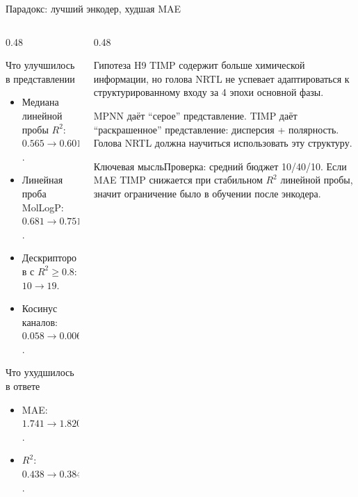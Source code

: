 \documentclass[aspectratio=169,10pt]{beamer}
\newcommand{\keybox}[1]{\begin{block}{Ключевая мысль}#1\end{block}}
\newcommand{\tightitems}{\setlength{\itemsep}{0.25em}}
\begin{document}
\begin{frame}{Парадокс: лучший энкодер, худшая MAE}
  \small
  \begin{columns}[T,onlytextwidth]
    \begin{column}{0.48\textwidth}
      \begin{block}{Что улучшилось в представлении}
        \scriptsize
        \begin{itemize}\tightitems
          \item Медиана линейной пробы $R^2$: $0.565 \to 0.601$.
          \item Линейная проба MolLogP: $0.681 \to 0.751$.
          \item Дескрипторов с $R^2\ge 0.8$: $10 \to 19$.
          \item Косинус каналов: $0.058 \to 0.006$.
        \end{itemize}
      \end{block}
      \begin{block}{Что ухудшилось в ответе}
        \scriptsize
        \begin{itemize}\tightitems
          \item MAE: $1.741 \to 1.820$.
          \item $R^2$: $0.438 \to 0.384$.
        \end{itemize}
      \end{block}
    \end{column}
    \begin{column}{0.48\textwidth}
      \begin{block}{Гипотеза H9}
        \scriptsize
        TIMP содержит больше химической информации, но голова NRTL
        не успевает адаптироваться к структурированному входу
        за 4 эпохи основной фазы.

        \vspace{0.35em}
        MPNN даёт ``серое'' представление. TIMP даёт ``раскрашенное''
        представление: дисперсия + полярность. Голова NRTL должна
        научиться использовать эту структуру.
      \end{block}
      \vspace{0.25em}
      \keybox{\scriptsize Проверка: средний бюджет 10/40/10.
      Если MAE TIMP снижается при стабильном $R^2$ линейной пробы,
      значит ограничение было в обучении после энкодера.}
    \end{column}
  \end{columns}
\end{frame}
\end{document}
